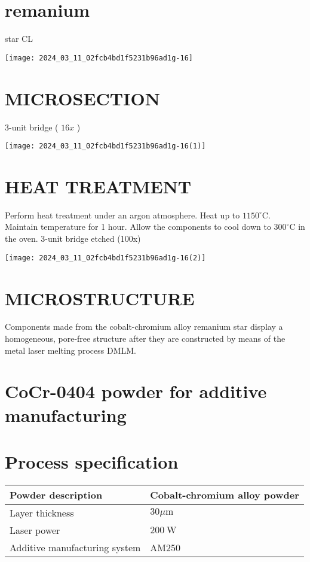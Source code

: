 \documentclass[10pt]{article}
\begin{document}
\section*{remanium}
 star CL\begin{center}
\texttt{[image: 2024\_03\_11\_02fcb4bd1f5231b96ad1g-16]}
\end{center}

\section*{MICROSECTION}
3-unit bridge ( $16 x$ )

\begin{center}
\texttt{[image: 2024\_03\_11\_02fcb4bd1f5231b96ad1g-16(1)]}
\end{center}

\section*{HEAT TREATMENT}
Perform heat treatment under an argon atmosphere. Heat up to $1150^{\circ} \mathrm{C}$. Maintain temperature for 1 hour. Allow the components to cool down to $300^{\circ} \mathrm{C}$ in the oven. 3-unit bridge etched (100x)

\begin{center}
\texttt{[image: 2024\_03\_11\_02fcb4bd1f5231b96ad1g-16(2)]}
\end{center}

\section*{MICROSTRUCTURE}
Components made from the cobalt-chromium alloy remanium star display a homogeneous, pore-free structure after they are constructed by means of the metal laser melting process DMLM.

\section*{CoCr-0404 powder for additive manufacturing}
\section*{Process specification}
\begin{center}
\begin{tabular}{|l|l|}
\hline
Powder description & Cobalt-chromium alloy powder \\
\hline
Layer thickness & $30 \mu \mathrm{m}$ \\
\hline
Laser power & $200 \mathrm{~W}$ \\
\hline
Additive manufacturing system & AM250 \\
\hline
\end{tabular}
\end{center}
\end{document}
